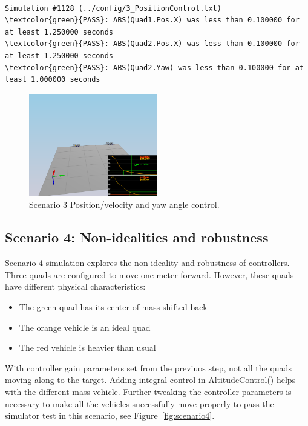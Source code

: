 \documentclass[a4paper]{article}
\begin{document}
\begin{Verbatim}[frame=lines, label=Simulator Test Result Output, commandchars=\\\{\}]

Simulation #1128 (../config/3_PositionControl.txt)
\textcolor{green}{PASS}: ABS(Quad1.Pos.X) was less than 0.100000 for at least 1.250000 seconds
\textcolor{green}{PASS}: ABS(Quad2.Pos.X) was less than 0.100000 for at least 1.250000 seconds
\textcolor{green}{PASS}: ABS(Quad2.Yaw) was less than 0.100000 for at least 1.000000 seconds
\end{Verbatim}

\begin{figure}[ht]
\centering
\includegraphics[width=0.5\textwidth]{./fig/scenario3.png}
\caption{\label{fig:scenario3} Scenario 3 Position/velocity and yaw angle control.}
\end{figure}

\subsection{Scenario 4: Non-idealities and robustness}

Scenario 4 simulation explores the non-ideality and robustness of controllers. Three quads are configured to move one meter forward. However, these quads have different physical characteristics:

\begin{itemize}
\item The green quad has its center of mass shifted back
\item The orange vehicle is an ideal quad
\item The red vehicle is heavier than usual
\end{itemize}

With controller gain parameters set from the previuos step, not all the quads  moving along to the target. Adding integral control in AltitudeControl() helps with the different-mass vehicle. Further tweaking the controller parameters is necessary to make all the vehicles successfully move properly  to pass the simulator test in this scenario, see Figure~\ref{fig:scenario4}.
\end{document}
